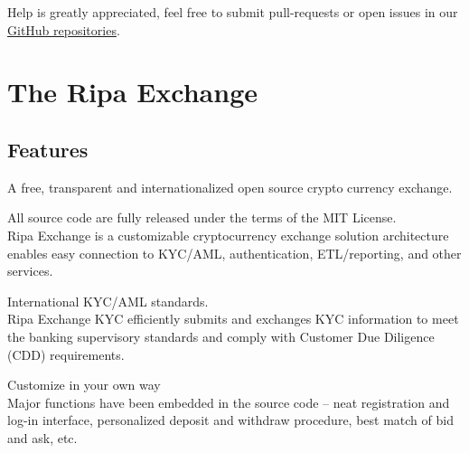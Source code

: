 \documentclass[11pt,fleqn,oneside]{book} %
\begin{document}
Help is greatly appreciated, feel free to submit pull-requests or open issues in our \href{https://github.com/RipaEx}{GitHub repositories}.

\section{The Ripa Exchange}
\subsection{Features}
A free, transparent and internationalized open source crypto currency exchange.

\begin{tcolorbox}[featureBox,
	title=\textsc{Open Source} \faCircleONotch]

	\small	All source code are fully released under the terms of the MIT License.\\\vspace{5mm}
	\tiny Ripa Exchange is a customizable cryptocurrency exchange solution architecture enables easy connection to KYC/AML, 
	authentication, ETL/reporting, and other services.
\end{tcolorbox}
\begin{tcolorbox}[featureBox,
	title=\textsc{Compliant} \faCheck]

	\small	International KYC/AML standards.\\\vspace{5mm}
	\tiny Ripa Exchange KYC efficiently submits and exchanges KYC information 
	to meet the banking supervisory standards and comply with Customer Due Diligence (CDD) requirements.
\end{tcolorbox}
\begin{tcolorbox}[featureBox,
	title=\textsc{Transparent \& Configurable} \faCogs]

	\small	Customize in your own way\\\vspace{5mm}
	\tiny Major functions have been embedded in the source code – neat registration and log-in interface, 
	personalized deposit and withdraw procedure, best match of bid and ask, etc. 
\end{tcolorbox}
\end{document}
